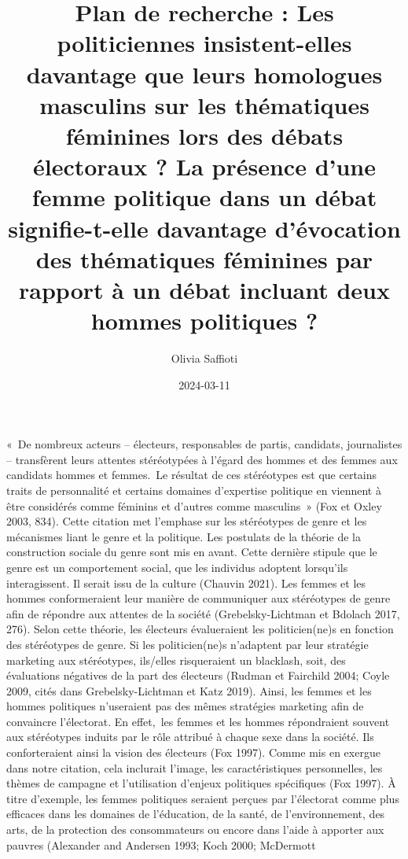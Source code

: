 \documentclass[
  letterpaper,
  DIV=11,
  numbers=noendperiod]{scrartcl}
\title{Plan de recherche : Les politiciennes insistent-elles davantage
que leurs homologues masculins sur les thématiques féminines lors des
débats électoraux ? La présence d'une femme politique dans un débat
signifie-t-elle davantage d'évocation des thématiques féminines par
rapport à un débat incluant deux hommes politiques ?}
\author{Olivia Saffioti}
\date{2024-03-11}
\begin{document}
\maketitle
\ifdefined\Shaded\renewenvironment{Shaded}{\begin{tcolorbox}[enhanced, borderline west={3pt}{0pt}{shadecolor}, boxrule=0pt, interior hidden, frame hidden, sharp corners, breakable]}{\end{tcolorbox}}\fi

«~De nombreux acteurs -- électeurs, responsables de partis, candidats,
journalistes -- transfèrent leurs attentes stéréotypées à l'égard des
hommes et des femmes aux candidats hommes et femmes.~Le résultat de ces
stéréotypes est que certains traits de personnalité et certains domaines
d'expertise politique en viennent à être considérés comme féminins et
d'autres comme masculins~» (Fox et Oxley 2003, 834). Cette citation met
l'emphase sur les stéréotypes de genre et les mécanismes liant le genre
et la politique. Les postulats de la théorie de la construction sociale
du genre sont mis en avant. Cette dernière stipule que le genre est un
comportement social, que les individus adoptent lorsqu'ils
interagissent. Il serait issu de la culture (Chauvin 2021). Les femmes
et les hommes conformeraient leur manière de communiquer aux stéréotypes
de genre afin de répondre aux attentes de la société (Grebelsky-Lichtman
et Bdolach 2017, 276). Selon cette théorie, les électeurs évalueraient
les politicien(ne)s en fonction des stéréotypes de genre. Si les
politicien(ne)s n'adaptent par leur stratégie marketing aux stéréotypes,
ils/elles risqueraient un blacklash, soit, des évaluations négatives de
la part des électeurs (Rudman et Fairchild 2004; Coyle 2009, cités dans
Grebelsky-Lichtman et Katz 2019). Ainsi, les femmes et les hommes
politiques n'useraient pas des mêmes stratégies marketing afin de
convaincre l'électorat. En effet,~les femmes et les hommes répondraient
souvent aux stéréotypes induits par le rôle attribué à chaque sexe dans
la société. Ils conforteraient ainsi la vision des électeurs (Fox 1997).
Comme mis en exergue dans notre citation, cela inclurait l'image, les
caractéristiques personnelles, les thèmes de campagne et l'utilisation
d'enjeux politiques spécifiques (Fox 1997). À titre d'exemple, les
femmes politiques seraient perçues par l'électorat comme plus efficaces
dans les domaines de l'éducation, de la santé, de l'environnement, des
arts, de la protection des consommateurs ou encore dans l'aide à
apporter aux pauvres (Alexander and Andersen 1993; Koch 2000; McDermott
\end{document}
